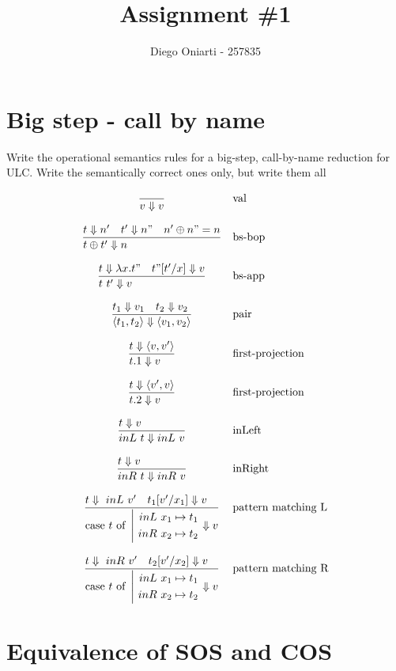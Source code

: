 \documentclass{article}
\title{Assignment \#1}
\author{Diego Oniarti - 257835}
\date{}
\newcommand{\bop}[0]{\ensuremath\oplus}
\newcommand{\st}[3][]{\ensuremath{\displaystyle\frac{#3\hfill}{#2\hfill} \text{#1}}}
\newcommand{\lam}[2]{\ensuremath{\lambda#1.#2}}
\newcommand{\inl}[0]{\ensuremath{\ inL\ }}
\newcommand{\inr}[0]{\ensuremath{\ inR\ }}
\newcommand{\case}[3]{\ensuremath{\text{case}\ #1\ \text{of}\ \left|\begin{aligned}#2\\#3\end{aligned}\right.}}
\newcommand{\Da}[0]{\ensuremath{\Downarrow}}
\begin{document}
\maketitle

\section{Big step - call by name}
Write the operational semantics rules for a big-step, call-by-name reduction for ULC. Write the semantically correct ones only, but write them all

\[\begin{array}{cl}
    \st{v\Downarrow v}{} & \text{val}\\
    \\
    \st{t \bop t' \Downarrow n}{t\Downarrow n' \quad t'\Downarrow n" \quad n'\bop n" = n} & \text{bs-bop} \\
    \\
    \st{t\ t'\Downarrow v}{t\Downarrow \lam{x}{t"} \quad t"[t'/x]\Downarrow v}  & \text{bs-app} \\
    \\
    \st{\langle t_1, t_2 \rangle \Downarrow \langle v_1,v_2 \rangle}{t_1\Downarrow v_1\quad t_2\Downarrow v_2} & \text{pair} \\
    \\
    \st{t.1\Downarrow v}{t\Downarrow \langle v,v' \rangle} & \text{first-projection} \\
    \\
    \st{t.2\Downarrow v}{t\Downarrow \langle v',v \rangle} & \text{first-projection} \\
    \\
    \st{inL\ t\Downarrow inL\ v}{t\Downarrow v} & \text{inLeft} \\
    \\
    \st{inR\ t\Downarrow inR\ v}{t\Downarrow v} & \text{inRight} \\
    \\
    \st{\case{t}{\inl x_1\mapsto t_1}{\inr x_2\mapsto t_2}\Downarrow v}{t\Da \inl v' \quad t_1[v'/x_1]\Da v} & \text{pattern matching L}
    \\ \\
    \st{\case{t}{\inl x_1\mapsto t_1}{\inr x_2\mapsto t_2}\Downarrow v}{t\Da \inr v' \quad t_2[v'/x_2]\Da v} & \text{pattern matching R}
\end{array}\] 

\section{Equivalence of SOS and COS}
\end{document}
